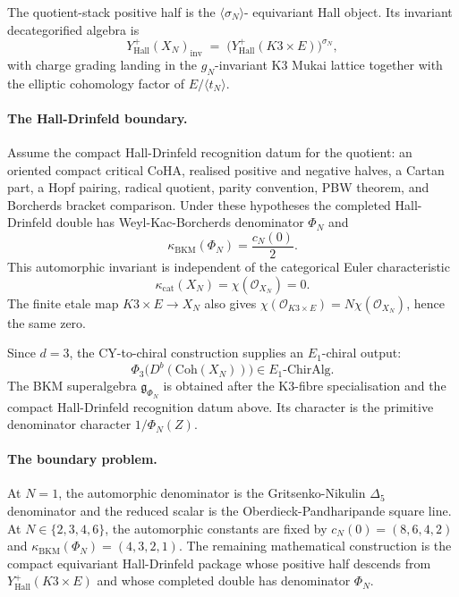 \documentclass{article}
\providecommand{\Coh}{\mathrm{Coh}}
\providecommand{\fg}{\mathfrak{g}}
\providecommand{\kBKM}{\kappa_{\mathrm{BKM}}}
\providecommand{\kcat}{\kappa_{\mathrm{cat}}}
\begin{document}
The quotient-stack positive half is the $\langle\sigma_N\rangle$-
equivariant Hall object. Its invariant decategorified algebra is
\[
  Y^+_{\mathrm{Hall}}(X_N)_{\mathrm{inv}}
  \;=\;
  \big(Y^+_{\mathrm{Hall}}(K3\times E)\big)^{\sigma_N},
\]
with charge grading landing in the $g_N$-invariant K3 Mukai lattice
together with the elliptic cohomology factor of
$E/\langle t_N\rangle$.

\paragraph{The Hall-Drinfeld boundary.}
Assume the compact Hall-Drinfeld recognition datum for the quotient:
an oriented compact critical CoHA, realised positive and negative
halves, a Cartan part, a Hopf pairing, radical quotient, parity
convention, PBW theorem, and Borcherds bracket comparison. Under these
hypotheses the completed Hall-Drinfeld double has Weyl-Kac-Borcherds
denominator $\Phi_N$ and
\[
  \kBKM(\Phi_N)=\frac{c_N(0)}2.
\]
This automorphic invariant is independent of the categorical Euler
characteristic
\[
  \kcat(X_N)=\chi(\mathcal{O}_{X_N})=0.
\]
The finite etale map $K3\times E\to X_N$ also gives
$\chi(\mathcal{O}_{K3\times E})=N\chi(\mathcal{O}_{X_N})$, hence the
same zero.

Since $d=3$, the CY-to-chiral construction supplies an $E_1$-chiral
output:
\[
  \Phi_3\bigl(D^b(\Coh(X_N))\bigr)\in E_1\text{-}\mathrm{ChirAlg}.
\]
The BKM superalgebra $\fg_{\Phi_N}$ is obtained after the K3-fibre
specialisation and the compact Hall-Drinfeld recognition datum above.
Its character is the primitive denominator character $1/\Phi_N(Z)$.

\paragraph{The boundary problem.}
At $N=1$, the automorphic denominator is the Gritsenko-Nikulin
$\Delta_5$ denominator and the reduced scalar is the
Oberdieck-Pandharipande square line. At $N\in\{2,3,4,6\}$, the
automorphic constants are fixed by
$c_N(0)=(8,6,4,2)$ and $\kBKM(\Phi_N)=(4,3,2,1)$. The remaining
mathematical construction is the compact equivariant Hall-Drinfeld
package whose positive half descends from
$Y^+_{\mathrm{Hall}}(K3\times E)$ and whose completed double has
denominator $\Phi_N$.
\end{document}
